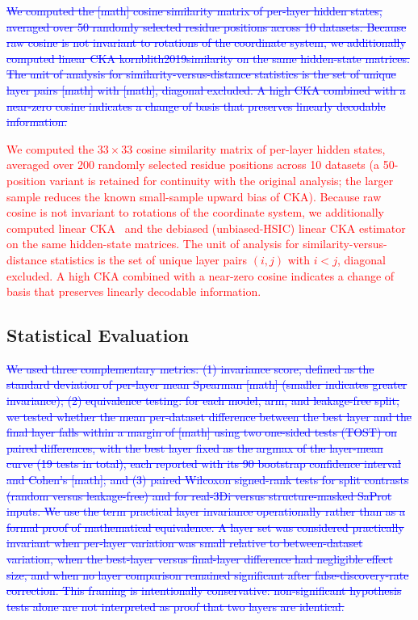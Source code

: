 \documentclass[11pt,a4paper]{article}
\newcommand{\rev}[1]{\textcolor{red}{#1}}
\begin{document}
\textcolor{blue}{\sout{We computed the [math] cosine similarity matrix of per-layer hidden states,
averaged over 50 randomly selected residue positions across 10 datasets. Because raw
cosine is not invariant to rotations of the coordinate system, we additionally computed
linear CKA kornblith2019similarity on the same hidden-state matrices. The unit
of analysis for similarity-versus-distance statistics is the set of unique layer pairs
[math] with [math], diagonal excluded. A high CKA combined with a near-zero cosine
indicates a change of basis that preserves linearly decodable information.}}

\textcolor{red}{\rev{We computed the $33 \times 33$ cosine similarity matrix of per-layer hidden
states, averaged over 200 randomly selected residue positions across 10 datasets
(a 50-position variant is retained for continuity with the original analysis;
the larger sample reduces the known small-sample upward bias of CKA). Because
raw cosine is not invariant to rotations of the coordinate system, we
additionally computed linear CKA~\cite{kornblith2019similarity} and the
debiased (unbiased-HSIC) linear CKA
estimator~\cite{szekely2021debiased} on the same hidden-state matrices. The unit
of analysis for similarity-versus-distance statistics is the set of unique layer
pairs $(i, j)$ with $i < j$, diagonal excluded. A high CKA combined with a
near-zero cosine indicates a change of basis that preserves linearly decodable
information.}}

\subsection{Statistical Evaluation}

\textcolor{blue}{\sout{We used three complementary metrics: (1) invariance score, defined as
the standard deviation of per-layer mean Spearman [math] (smaller indicates greater invariance);
(2) equivalence testing: for each model, arm, and leakage-free split,
we tested whether the mean per-dataset difference between the best layer and the final
layer falls within a margin of [math] using two one-sided tests (TOST) on
paired differences, with the best layer fixed as the argmax of the layer-mean curve
(19 tests in total), each reported with its 90 bootstrap confidence interval and
Cohen's [math]; and (3) paired Wilcoxon signed-rank tests for split contrasts
(random versus leakage-free) and for real-3Di versus structure-masked SaProt inputs.
We use the term practical layer invariance operationally rather than as a
formal proof of mathematical equivalence. A layer set was considered practically
invariant when per-layer variation was small relative to between-dataset variation,
when the best-layer versus final-layer difference had negligible effect size, and
when no layer comparison remained significant after false-discovery-rate correction.
This framing is intentionally conservative: non-significant hypothesis tests alone
are not interpreted as proof that two layers are identical.}}
\end{document}
